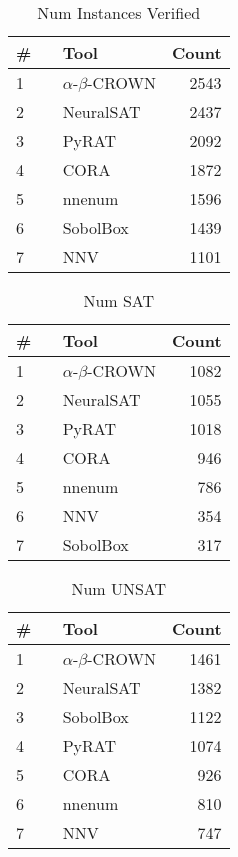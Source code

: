 \begin{table}[h]
\begin{center}
\caption{Num Instances Verified} \label{tab:stats1}
{\setlength{\tabcolsep}{2pt}
\begin{tabular}[h]{@{}llr@{}}
\toprule
\textbf{\# ~} & \textbf{Tool} & \textbf{Count}\\
\midrule
1 & $\alpha$-$\beta$-CROWN & 2543 \\
2 & NeuralSAT & 2437 \\
3 & PyRAT & 2092 \\
4 & CORA & 1872 \\
5 & nnenum & 1596 \\
6 & SobolBox & 1439 \\
7 & NNV & 1101 \\
\bottomrule
\end{tabular}
}
\end{center}
\end{table}




\begin{table}[h]
\begin{center}
\caption{Num SAT} \label{tab:stats2}
{\setlength{\tabcolsep}{2pt}
\begin{tabular}[h]{@{}llr@{}}
\toprule
\textbf{\# ~} & \textbf{Tool} & \textbf{Count}\\
\midrule
1 & $\alpha$-$\beta$-CROWN & 1082 \\
2 & NeuralSAT & 1055 \\
3 & PyRAT & 1018 \\
4 & CORA & 946 \\
5 & nnenum & 786 \\
6 & NNV & 354 \\
7 & SobolBox & 317 \\
\bottomrule
\end{tabular}
}
\end{center}
\end{table}




\begin{table}[h]
\begin{center}
\caption{Num UNSAT} \label{tab:stats3}
{\setlength{\tabcolsep}{2pt}
\begin{tabular}[h]{@{}llr@{}}
\toprule
\textbf{\# ~} & \textbf{Tool} & \textbf{Count}\\
\midrule
1 & $\alpha$-$\beta$-CROWN & 1461 \\
2 & NeuralSAT & 1382 \\
3 & SobolBox & 1122 \\
4 & PyRAT & 1074 \\
5 & CORA & 926 \\
6 & nnenum & 810 \\
7 & NNV & 747 \\
\bottomrule
\end{tabular}
}
\end{center}
\end{table}



